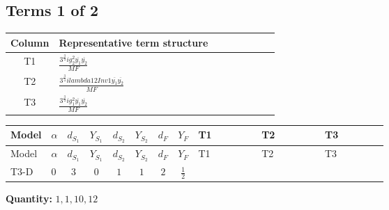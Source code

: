 \documentclass[8pt]{article}
\begin{document}
\begin{landscape}
\subsection*{Terms 1 of 2}
\begin{center}
\begin{tabular}{@{}c >{\raggedright\arraybackslash}p{0.82\linewidth}@{}}
\toprule
Column & Representative term structure \\
\midrule
T1 & \(\displaystyle \frac{3^{\frac{3}{4}} i g_{2}^{2} \overline{y_{1}} \overline{y_{2}}}{MF}\) \\
\midrule
T2 & \(\displaystyle \frac{3^{\frac{3}{4}} i lambda12Inv1 \overline{y_{1}} \overline{y_{2}}}{MF}\) \\
\midrule
T3 & \(\displaystyle \frac{3^{\frac{3}{4}} i g_{1}^{2} \overline{y_{1}} \overline{y_{2}}}{MF}\) \\
\midrule
\bottomrule
\end{tabular}
\end{center}
\smallskip
\tiny
\begin{longtable}{@{}llcccccc >{\raggedright\arraybackslash}p{0.21\linewidth} >{\raggedright\arraybackslash}p{0.21\linewidth} >{\raggedright\arraybackslash}p{0.21\linewidth}@{}}
\toprule
Model & $\alpha$ & $d_{S_1}$ & $Y_{S_1}$ & $d_{S_2}$ & $Y_{S_2}$ & $d_F$ & $Y_F$ & T1 & T2 & T3 \\
\midrule
\endfirsthead
\toprule
Model & $\alpha$ & $d_{S_1}$ & $Y_{S_1}$ & $d_{S_2}$ & $Y_{S_2}$ & $d_F$ & $Y_F$ & T1 & T2 & T3 \\
\midrule
\endhead
T3-D & $0$ & $3$ & $0$ & $1$ & $1$ & $2$ & $\frac{1}{2}$ & \scriptsize\adjustbox{max width=\linewidth}{$\begin{gathered} - \frac{11 \cdot 3^{\frac{3}{4}} i g_{2}^{2} \overline{y_{1}} \overline{y_{2}}}{8 MF}\end{gathered}$} & \scriptsize\adjustbox{max width=\linewidth}{$\begin{gathered} - \frac{3^{\frac{3}{4}} i lambda12Inv1 \overline{y_{1}} \overline{y_{2}}}{6 MF}\end{gathered}$} & \scriptsize\adjustbox{max width=\linewidth}{$\begin{gathered} - \frac{3^{\frac{3}{4}} i g_{1}^{2} \overline{y_{1}} \overline{y_{2}}}{8 MF}\end{gathered}$} \\
\midrule
\bottomrule
\end{longtable}
\clearpage
\noindent\textbf{Quantity: }$\mathrm{1,1,10,12}$\par\smallskip

\end{landscape}
\end{document}
